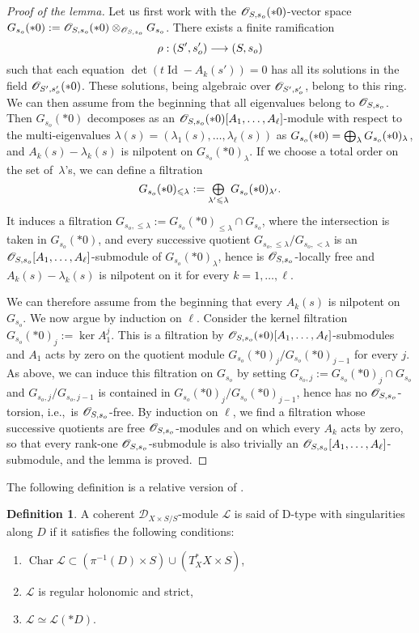 \documentclass[english]{smfart}
\numberwithin{subsection}{section}
\def\shd{\mathcal{D}}\let\cD\shd
\def\shl{\mathcal{L}}
\newcommand{\XS}{X\times S}
\newcommand{\DXS}{\shd_{\XS/S}}
\DeclareMathOperator{\Char}{Char}
\DeclareMathOperator{\id}{Id}\let\Id\id
\let\leq\leqslant
\def\ie{i.e.,\ }
\numberwithin{equation}{section}
\theoremstyle{plain}
\theoremstyle{definition}
\newtheorem{definition}[equation]{Definition}
\def\to{\mathchoice{\longrightarrow}{\rightarrow}{\rightarrow}{\rightarrow}}
\let\oldbigoplus\bigoplus
\renewcommand{\bigoplus}{\mathop{\textstyle\oldbigoplus}\displaylimits}
\begin{document}
\begin{proof}[Proof of the lemma]
Let us first work with the $\cO_{S,s_o}(*0)$-vector space $G_{s_o}(*0):=\cO_{S,s_o}(*0)\otimes_{\cO_{S,s_o}}G_{s_o}$. There exists a finite ramification $$\rho:(S',s'_o)\to (S,s_o)$$ such that each equation $\det(t\id-A_k(s'))=0$ has all its solutions in the field $\cO_{S',s'_o}(*0)$. These solutions, being algebraic over $\cO_{S',s'_o}$, belong to this ring. We can then assume from the beginning that all eigenvalues belong to $\cO_{S,s_o}$. Then $G_{s_o}(*0)$ decomposes as an $\cO_{S,s_o}(*0)[A_1,\dots,A_\ell]$-module with respect to the multi-eigenvalues $\lambda(s)=(\lambda_1(s),\dots,\lambda_\ell(s))$ as $G_{s_o}(*0)=\bigoplus_\lambda G_{s_o}(*0)_\lambda$, and $A_k(s)-\lambda_k(s)$ is nilpotent on $G_{s_o}(*0)_\lambda$. If we choose a total order on the set of~$\lambda$'s, we can define a filtration $$G_{s_o}(*0)_{\leq\lambda}:=\bigoplus_{\lambda'\leq\lambda} G_{s_o}(*0)_{\lambda'}.$$ It induces a filtration $G_{s_o,\leq\lambda}:=G_{s_o}(*0)_{\leq\lambda}\cap G_{s_o}$, where the intersection is taken in $G_{s_o}(*0)$, and every successive quotient $G_{s_o,\leq\lambda}/G_{s_o,<\lambda}$ is an $\cO_{S,s_o}[A_1,\dots,A_\ell]$-submodule of $G_{s_o}(*0)_\lambda$, hence is $\cO_{S,s_o}$-locally free and $A_k(s)-\lambda_k(s)$ is nilpotent on it for every $k=1,\dots,\ell$.

We can therefore assume from the beginning that every $A_k(s)$ is nilpotent on $G_{s_o}$. We now argue by induction on $\ell$. Consider the kernel filtration $G_{s_o}(*0)_j:=\ker A_1^j$. This is a filtration by $\cO_{S,s_o}(*0)[A_1,\dots,A_\ell]$-submodules and $A_1$ acts by zero on the quotient module $G_{s_o}(*0)_j/G_{s_o}(*0)_{j-1}$ for every $j$. As above, we can induce this filtration on $ G_{s_o}$ by setting $G_{s_o,j}:=G_{s_o}(*0)_j\cap G_{s_o}$ and $G_{s_o,j}/G_{s_o,j-1}$ is contained in $G_{s_o}(*0)_j/G_{s_o}(*0)_{j-1}$, hence has no $\cO_{S,s_o}$-torsion, \ie is $\cO_{S,s_o}$-free. By induction on $\ell$, we find a filtration whose successive quotients are free $\cO_{S,s_o}$-modules and on which every $A_k$ acts by zero, so that every rank-one $\cO_{S,s_o}$-submodule is also trivially an $\cO_{S,s_o}[A_1,\dots,A_\ell]$-submodule, and the lemma is proved.
\end{proof}

The following definition is a relative version of \cite[Def.\,2.3.1]{K-K81}.

\begin{definition}\label{D-t}
A coherent $\DXS$-module $\shl$ is said of D-type with singularities along $D$ if it satisfies the following conditions:
\begin{enumerate}
\item
$\Char\shl\subset (\pi^{-1}(D)\times S)\cup (T^*_{X} \XS)$,
\item
$\shl$ is regular holonomic and strict,
\item
$\shl\simeq\shl(*D)$.
\end{enumerate}
\end{definition}
\end{document}
